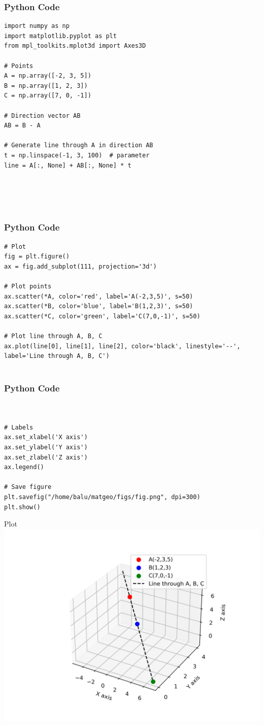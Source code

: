 \documentclass{beamer}
\begin{document}
\begin{frame}[fragile]
    \frametitle{Python Code}
    \begin{lstlisting}
import numpy as np
import matplotlib.pyplot as plt
from mpl_toolkits.mplot3d import Axes3D

# Points
A = np.array([-2, 3, 5])
B = np.array([1, 2, 3])
C = np.array([7, 0, -1])

# Direction vector AB
AB = B - A

# Generate line through A in direction AB
t = np.linspace(-1, 3, 100)  # parameter
line = A[:, None] + AB[:, None] * t





    \end{lstlisting}
\end{frame}

\begin{frame}[fragile]
    \frametitle{Python Code}
    \begin{lstlisting}
# Plot
fig = plt.figure()
ax = fig.add_subplot(111, projection='3d')

# Plot points
ax.scatter(*A, color='red', label='A(-2,3,5)', s=50)
ax.scatter(*B, color='blue', label='B(1,2,3)', s=50)
ax.scatter(*C, color='green', label='C(7,0,-1)', s=50)

# Plot line through A, B, C
ax.plot(line[0], line[1], line[2], color='black', linestyle='--', label='Line through A, B, C')


    \end{lstlisting}
\end{frame}

\begin{frame}[fragile]
    \frametitle{Python Code}
    \begin{lstlisting}


# Labels
ax.set_xlabel('X axis')
ax.set_ylabel('Y axis')
ax.set_zlabel('Z axis')
ax.legend()

# Save figure
plt.savefig("/home/balu/matgeo/figs/fig.png", dpi=300)
plt.show()
    \end{lstlisting}
\end{frame}

\begin{frame}{Plot}
    \centering
    \includegraphics[width=\columnwidth, height=0.8\textheight, keepaspectratio]{figs/fig.png}     
\end{frame}
\end{document}
